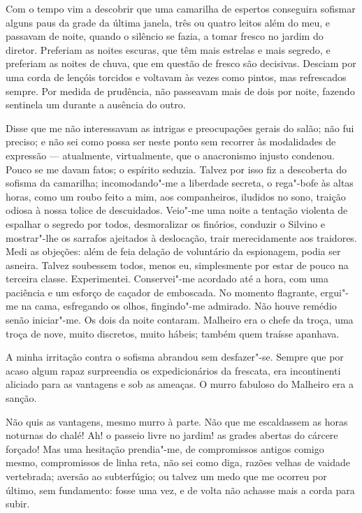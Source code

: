 Com o tempo vim a descobrir que uma camarilha de espertos conseguira
sofismar alguns paus da grade da última janela, três ou quatro leitos
além do meu, e passavam de noite, quando o silêncio se fazia, a tomar
fresco no jardim do diretor. Preferiam as noites escuras, que têm mais
estrelas e mais segredo, e preferiam as noites de chuva, que em questão
de fresco são decisivas. Desciam por uma corda de lençóis torcidos e
voltavam às vezes como pintos, mas refrescados sempre. Por medida de
prudência, não passeavam mais de dois por noite, fazendo sentinela um
durante a ausência do outro. 

Disse que me não interessavam as intrigas
e preocupações gerais do salão; não fui preciso; e não sei como possa
ser neste ponto sem recorrer às modalidades de expressão --- atualmente, 
virtualmente, que o anacronismo injusto condenou. Pouco se
me davam fatos; o espírito seduzia. Talvez por isso fiz a descoberta do
sofisma da camarilha; incomodando"-me a liberdade secreta, o
rega"-bofe às altas horas, como um roubo feito a mim, aos
companheiros, iludidos no sono, traição odiosa à nossa tolice de
descuidados. Veio"-me uma noite a tentação violenta de espalhar o
segredo por todos, desmoralizar os finórios, conduzir o Silvino e
mostrar"-lhe os sarrafos ajeitados à deslocação, trair merecidamente
aos traidores. Medi as objeções: além de feia delação de voluntário da
espionagem, podia ser asneira. Talvez soubessem todos, menos eu,
simplesmente por estar de pouco na terceira classe. Experimentei.
Conservei"-me acordado até a hora, com uma paciência e um esforço de
caçador de emboscada. No momento flagrante, ergui"-me na cama,
esfregando os olhos, fingindo"-me admirado. Não houve remédio senão
iniciar"-me. Os dois da noite contaram. Malheiro era o chefe da troça,
uma troça de nove, muito discretos, muito hábeis; também quem traísse
apanhava. 

A minha irritação contra o sofisma abrandou sem
desfazer"-se. Sempre que por acaso algum rapaz surpreendia os
expedicionários da frescata, era incontinenti aliciado para as
vantagens e sob as ameaças. O murro fabuloso do Malheiro era a sanção.

Não quis as vantagens, mesmo murro à parte. Não que me escaldassem as
horas noturnas do chalé! Ah! o passeio livre no jardim! as grades
abertas do cárcere forçado! Mas uma hesitação prendia"-me, de
compromissos antigos comigo mesmo, compromissos de linha reta, não sei
como diga, razões velhas de vaidade vertebrada; aversão ao subterfúgio;
ou talvez um medo que me ocorreu por último, sem fundamento: fosse uma
vez, e de volta não achasse mais a corda para subir. 

